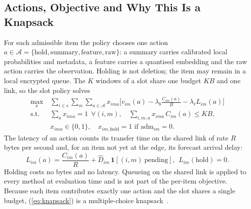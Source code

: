 \documentclass[conference,a4paper]{IEEEtran}
\begin{document}
\subsection{Actions, Objective and Why This Is a Knapsack}
For each admissible item the policy chooses one action $a\in\mathcal A=\{\text{hold},\text{summary},\text{feature},\text{raw}\}$: a summary carries calibrated local probabilities and metadata, a feature carries a quantised embedding and the raw action carries the observation. Holding is not deletion; the item may remain in a local encrypted queue. The $K$ windows of a slot share one budget $KB$ and one link, so the slot policy solves
\begin{align}
\label{eq:knapsack}
\max_{x}\ & \sum_{i\in s}\sum_{m}\sum_{a\in\mathcal A} x_{ima}\Big[v_{im}(a)-\lambda_b\tfrac{C_{im}(a)}{B}-\lambda_\ell L_{im}(a)\Big] \nonumber\\
\text{s.t.}\ & \textstyle\sum_{a} x_{ima}=1\ \ \forall (i,m),\quad \sum_{i,m,a} x_{ima}\,C_{im}(a)\le KB, \nonumber\\
& x_{ima}\in\{0,1\},\quad x_{im,\text{hold}}=1 \text{ if } \mathrm{adm}_{im}=0.
\end{align}
The latency of an action counts its transfer time on the shared link of rate $R$ bytes per second and, for an item not yet at the edge, its forecast arrival delay:
\begin{equation}
\label{eq:latency}
L_{im}(a)=\frac{C_{im}(a)}{R}+\hat D_{im}\,\mathbf 1[(i,m)\ \text{pending}],\ \ L_{im}(\text{hold})=0.
\end{equation}
Holding costs no bytes and no latency. Queueing on the shared link is applied to every method at evaluation time and is not part of the per-item objective. Because each item contributes exactly one action and the slot shares a single budget, (\ref{eq:knapsack}) is a multiple-choice knapsack~\cite{knapsack}.
\end{document}
